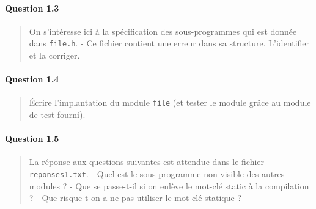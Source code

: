 \documentclass[11pt]{article}
\begin{document}
\paragraph{Question 1.3}\label{question-1.3}

\begin{quote}
On s'intéresse ici à la spécification des sous-programmes qui est donnée
dans \texttt{file.h}. - Ce fichier contient une erreur dans sa
structure. L'identifier et la corriger.
\end{quote}

\paragraph{Question 1.4}\label{question-1.4}

\begin{quote}
Écrire l'implantation du module \texttt{file} (et tester le module grâce
au module de test fourni).
\end{quote}

\paragraph{Question 1.5}\label{question-1.5}

\begin{quote}
La réponse aux questions suivantes est attendue dans le fichier
\texttt{reponses1.txt}. - Quel est le sous-programme non-visible des
autres modules ? - Que se passe-t-il si on enlève le mot-clé static à la
compilation ? - Que risque-t-on a ne pas utiliser le mot-clé statique ?
\end{quote}


    
    
    
    
\end{document}

